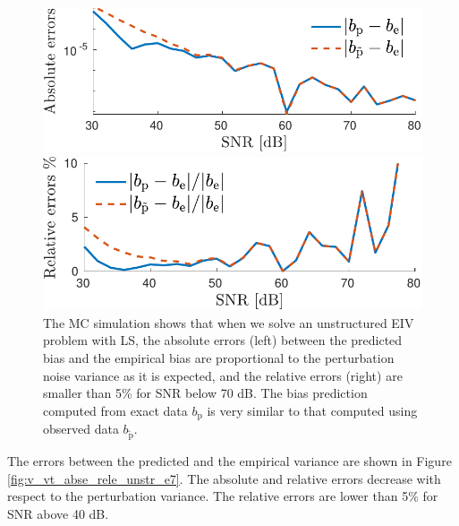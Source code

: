 \begin{figure}[htb!]
    \centering
    \begin{minipage}{0.45\textwidth}
        \centering
        \includegraphics[width=1\textwidth]{./ChapterStatisticalAnalysis/fig/Fig_2l.pdf} 
    \end{minipage}
    \begin{minipage}{0.45\textwidth}
        \centering
        \includegraphics[width=1\textwidth]{./ChapterStatisticalAnalysis/fig/Fig_2r.pdf} 
    \end{minipage}
  \caption{ \label{fig:b_bt_abse_rele_unstr_e7} The MC simulation shows that when we solve an unstructured EIV problem with LS, the absolute errors (left) between the predicted bias and the empirical bias are proportional to the perturbation noise variance as it is expected, and the relative errors (right) are smaller than 5\% for SNR below 70 dB. The bias prediction computed from exact data ${b}_\mathrm{p}$ is very similar to that computed using observed data $b_{\widetilde{\mathrm{p}}}$. } 
\end{figure}

The errors between the predicted and the empirical variance are shown in Figure \ref{fig:v_vt_abse_rele_unstr_e7}.
The absolute and relative errors decrease with respect to the perturbation variance.
The relative errors are lower than 5\% for SNR above 40 dB. 

